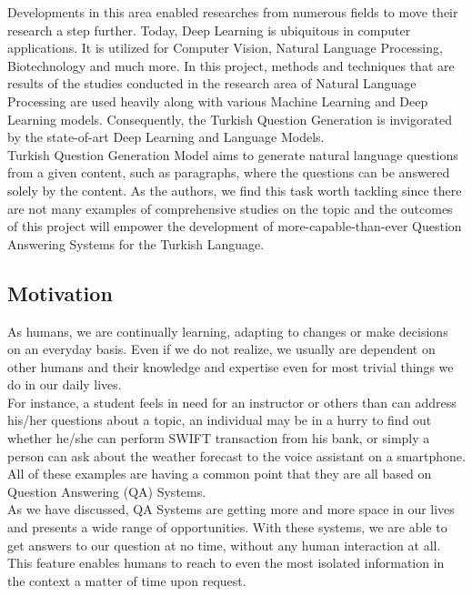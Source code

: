 \documentclass{mefsdp}
\begin{document}
	Developments in this area enabled researches from numerous fields to move their research a step further. Today, Deep Learning is ubiquitous in computer applications. It is utilized for Computer Vision, Natural Language Processing, Biotechnology and much more. In this project, methods and techniques that are results of the studies conducted in the research area of Natural Language Processing are used heavily along with various Machine Learning and Deep Learning models. Consequently, the Turkish Question Generation is invigorated by the state-of-art Deep Learning and Language Models.\\
	
	Turkish Question Generation Model aims to generate natural language questions from a given content, such as paragraphs, where the questions can be answered solely by the content.   As the authors, we find this task worth tackling since there are not many examples of comprehensive studies on the topic and the outcomes of this project will empower the development of more-capable-than-ever Question Answering Systems for the Turkish Language. 
	\newpage
	
	\subsection{Motivation}
	
	As humans, we are continually learning, adapting to changes or make decisions on an everyday basis. Even if we do not realize, we usually are dependent on other humans and their knowledge and expertise even for most trivial things we do in our daily lives.\\
	
	For instance, a student feels in need for an instructor or others than can address his/her questions about a topic, an individual may be in a hurry to find out whether he/she can perform SWIFT transaction from his bank, or simply a person can ask about the weather forecast to the voice assistant on a smartphone. All of these examples are having a common point that they are all based on Question Answering (QA) Systems.\\
	
	As we have discussed, QA Systems are getting more and more space in our lives and presents a wide range of opportunities. With these systems, we are able to get answers to our question at no time, without any human interaction at all. This feature enables humans to reach to even the most isolated information in the context a matter of time upon request.\\
	
\end{document}
